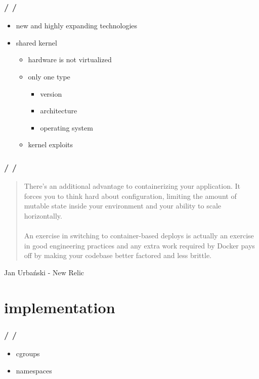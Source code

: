 \documentclass{beamer}
\newcommand{\autotitle}
{\frametitle{
    \secname
    \ifx\insertsubsection\empty
    \else
        /\subsecname
        \ifx\insertsubsubsection\empty\else/\subsubsecname\fi
    \fi}}
\begin{document}
\begin{frame}
    \autotitle
    \begin{itemize}
        \item new and highly expanding technologies
        \item shared kernel
        \begin{itemize}
            \item hardware is not virtualized
            \item only one type
            \begin{itemize}
                \item version
                \item architecture
                \item operating system
            \end{itemize}
            \item kernel exploits
        \end{itemize}
    \end{itemize}
\end{frame}

\begin{frame}
    \autotitle
    \begin{quote}
        There’s an additional advantage to containerizing your application. It
        forces you to think hard about configuration, limiting the amount of
        mutable state inside your environment and your ability to scale
        horizontally.
        \\~\\
        An exercise in switching to container-based deploys is actually an
        exercise in good engineering practices and any extra work required by
        Docker pays off by making your codebase better factored and less
        brittle.
    \end{quote}
    Jan Urbański - New Relic
\end{frame}

\section{implementation}

\begin{frame}
    \autotitle
    \begin{itemize}
        \item cgroups
        \item namespaces
    \end{itemize}
\end{frame}
\end{document}
